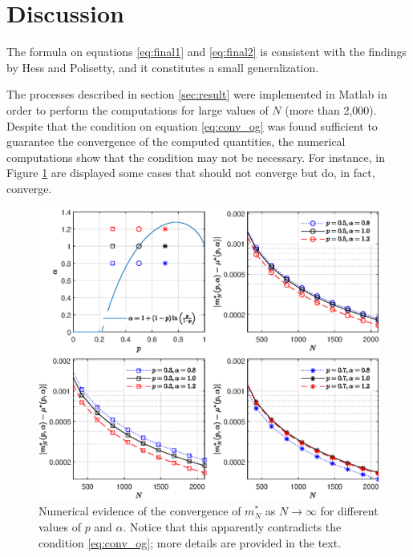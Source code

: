 \documentclass{article}
\begin{document}
\section{Discussion}

The formula on equations \eqref{eq:final1} and \eqref{eq:final2} is consistent with the findings by Hess and Polisetty, and it constitutes a small generalization.

%
The processes described in section \ref{sec:result} were implemented in Matlab in order to perform the computations for large values of $N$ (more than 2,000).
%
Despite that the condition on equation \eqref{eq:conv_og} was found sufficient to guarantee the convergence of the computed quantities, the numerical computations show that the condition may not be necessary.
%
For instance, in Figure \ref{fig:onlyfig} are displayed some cases that should not converge but do, in fact, converge.

\begin{figure}
    \centering
    \includegraphics[width=\linewidth]{paradox02.eps}
    \caption{Numerical evidence of the convergence of $m^*_N$ as $N\rightarrow \infty$ for different values of $p$ and $\alpha$. Notice that this apparently contradicts the condition \eqref{eq:conv_og}; more details are provided in the text.}
    \label{fig:onlyfig}
\end{figure}
\end{document}
